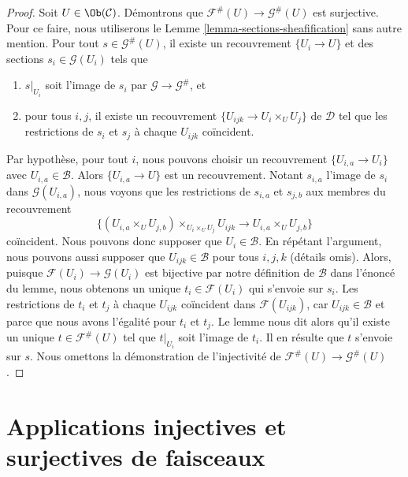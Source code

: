 \begin{proof}
Soit $U \in \Ob(\mathcal{C})$.
Démontrons que $\mathcal{F}^\#(U) \to \mathcal{G}^\#(U)$ est
surjective. Pour ce faire, nous utiliserons le Lemme \ref{lemma-sections-sheafification}
sans autre mention. Pour tout $s \in \mathcal{G}^\#(U)$, il existe
un recouvrement $\{U_i \to U\}$ et des sections $s_i \in \mathcal{G}(U_i)$ tels que
\begin{enumerate}
\item $s|_{U_i}$ soit l’image de $s_i$ par $\mathcal{G} \to \mathcal{G}^\#$,
et
\item pour tous $i, j$, il existe un recouvrement
$\{U_{ijk} \to U_i \times_U U_j\}$ de $\mathcal{D}$ tel que
les restrictions de $s_i$ et $s_j$ à chaque $U_{ijk}$ coïncident.
\end{enumerate}
Par hypothèse, pour tout $i$, nous pouvons choisir un recouvrement $\{U_{i, a} \to U_i\}$
avec $U_{i, a} \in \mathcal{B}$. Alors $\{U_{i, a} \to U\}$ est un recouvrement.
Notant $s_{i, a}$ l’image de $s_i$ dans $\mathcal{G}(U_{i, a})$,
nous voyons que les restrictions de $s_{i, a}$ et $s_{j, b}$ aux membres
du recouvrement
$$
\{(U_{i, a} \times_U U_{j, b}) \times_{U_i \times_U U_j} U_{ijk}
\to U_{i, a} \times_U U_{j, b}\}
$$
coïncident. Nous pouvons donc supposer que $U_i \in \mathcal{B}$. En répétant
l’argument, nous pouvons aussi supposer que $U_{ijk} \in \mathcal{B}$ pour
tous $i, j, k$ (détails omis).
Alors, puisque $\mathcal{F}(U_i) \to \mathcal{G}(U_i)$
est bijective par notre définition de $\mathcal{B}$ dans l’énoncé
du lemme, nous obtenons un unique $t_i \in \mathcal{F}(U_i)$
qui s’envoie sur $s_i$. Les restrictions de $t_i$ et $t_j$
à chaque $U_{ijk}$ coïncident dans $\mathcal{F}(U_{ijk})$, car
$U_{ijk} \in \mathcal{B}$ et parce que nous avons l’égalité
pour $t_i$ et $t_j$.
Le lemme nous dit alors qu’il existe un unique
$t \in \mathcal{F}^\#(U)$ tel que $t|_{U_i}$ soit l’image de $t_i$.
Il en résulte que $t$ s’envoie sur $s$.
Nous omettons la démonstration de l’injectivité de
$\mathcal{F}^\#(U) \to \mathcal{G}^\#(U)$.
\end{proof}








\section{Applications injectives et surjectives de faisceaux}
\label{section-sheaves-injective}

